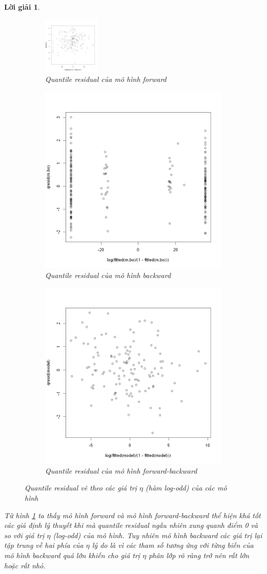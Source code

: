 \documentclass[14pt, a4paper]{article}
\theoremstyle{sltheorem}
\theoremstyle{soltheorem}
\newtheorem*{loigiai}{Lời giải}
\begin{document}
\begin{loigiai}
    \begin{figure}[h!]
        \centering
        \begin{subfigure}[b]{\textwidth}
            \includegraphics[width=0.3\textwidth]{figures/mf_fitted.png}
            \caption{Quantile residual của mô hình forward}
        \end{subfigure}
        \hfill
        \begin{subfigure}[b]{\linewidth}
            \includegraphics[width=0.3\linewidth]{figures/mb_fitted.png}
            \caption{Quantile residual của mô hình backward}
        \end{subfigure}
        \hfill
        \begin{subfigure}[b]{\textwidth}
            \includegraphics[width=0.3\linewidth]{figures/mbo_fitted.png}
            \caption{Quantile residual của mô hình forward-backward}
        \end{subfigure}
        \caption{Quantile residual vẽ theo các giá trị $\eta$ (hàm log-odd) của các mô hình}
        \label{fig:Quantile-fitted}
    \end{figure}

    Từ hình \ref{fig:Quantile-fitted} ta thấy mô hình forward và mô hình forward-backward thể hiện khá tốt các giả định lý thuyết khi mà quantile residual ngẫu nhiên xung quanh điểm 0 và so với giá trị $\eta$ (log-odd) của mô hình.
    Tuy nhiên mô hình backward các giá trị lại tập trung về hai phía của $\eta$ lý do là vì các tham số tương ứng với từng biến của mô hình backward quá lớn khiến cho giá trị $\eta$ phân lớp rõ ràng trở nên rất lớn hoặc rất nhỏ.


\end{loigiai}
\end{document}
